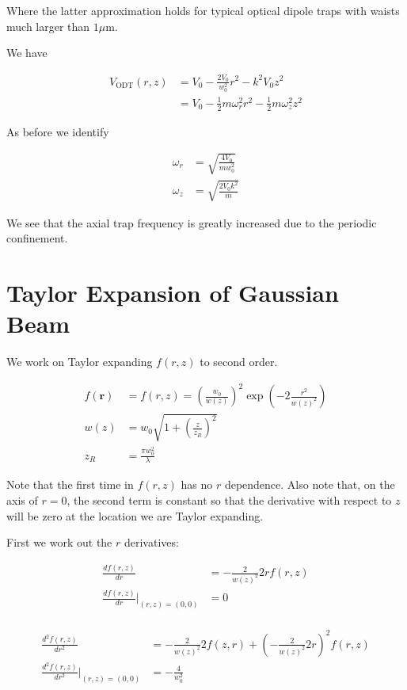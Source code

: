 \documentclass[12pt]{article}
\newcommand{\bv}[1]{\boldsymbol{#1}}
\begin{document}
Where the latter approximation holds for typical optical dipole traps with waists much larger than $1 \mu\text{m}$.

We have

\begin{align}
V_{\text{ODT}}(r,z) &= V_0 - \frac{2V_0}{w_0^2}r^2 - k^2 V_0 z^2\\
&= V_0 - \frac{1}{2} m \omega_r^2 r^2 - \frac{1}{2} m \omega_z^2 z^2
\end{align}

As before we identify

\begin{align}
\omega_r &= \sqrt{\frac{4V_0}{mw_0^2}}\\
\omega_z &= \sqrt{\frac{2V_0k^2}{m}}
\end{align}

We see that the axial trap frequency is greatly increased due to the periodic confinement.


\section{Taylor Expansion of Gaussian Beam}
We work on Taylor expanding $f(r,z)$ to second order.

\begin{align}
f(\bv{r}) &=  f(r,z) = \left(\frac{w_0}{w(z)}\right)^2 \exp\left(-2\frac{r^2}{w(z)^2}\right)\\
w(z) &= w_0\sqrt{1+\left(\frac{z}{z_R}\right)^2}\\
z_R & = \frac{\pi w_0^2}{\lambda}
\end{align} 

Note that the first time in $f(r,z)$ has no $r$ dependence. Also note that, on the axis of $r=0$, the second term is constant so that the derivative with respect to $z$ will be zero at the location we are Taylor expanding.

First we work out the $r$ derivatives:

\begin{align}
\frac{df(r,z)}{dr} &= -\frac{2}{w(z)^2} 2r f(r,z)\\
\frac{df(r,z)}{dr} \Big|_{(r,z) = (0,0)} &= 0\\
\end{align}

\begin{align}
\frac{d^2f(r,z)}{dr^2} &= -\frac{2}{w(z)^2}2 f(z,r) + \left(-\frac{2}{w(z)^2} 2r\right)^2f(r,z)\\
\frac{d^2f(r,z)}{dr^2} \Big|_{(r,z)=(0,0)} &= -\frac{4}{w_0^2}
\end{align}
\end{document}
